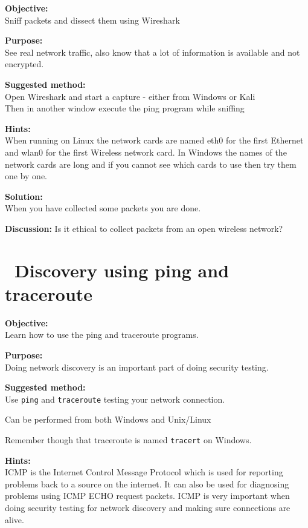 \documentclass[a4paper,11pt,notitlepage]{report}
\begin{document}
{\bf Objective:}\\
Sniff packets and dissect them using Wireshark

{\bf Purpose:}\\
See real network traffic, also know that a lot of information is available and not encrypted.

{\bf Suggested method:}\\
Open Wireshark and start a capture - either from Windows or Kali\\
Then in another window execute the ping program while sniffing

{\bf Hints:}\\
When running on Linux the network cards are named eth0 for the first Ethernet and wlan0 for the first Wireless network card. In Windows the names of the network cards are long and if you cannot see which cards to use then try them one by one.

{\bf Solution:}\\
When you have collected some packets you are done.

{\bf Discussion:}
Is it ethical to collect packets from an open wireless network?

\chapter{\faInfoCircle\ Discovery using ping and traceroute}
\label{ex:ping}

{\bf Objective:}\\
Learn how to use the ping and traceroute programs.

{\bf Purpose:}\\
Doing network discovery is an important part of doing security testing.

{\bf Suggested method:} \\
Use \verb+ping+ and \verb+traceroute+ testing your network connection.

Can be performed from both Windows and Unix/Linux

Remember though that traceroute is named \verb+tracert+ on Windows.

{\bf Hints:} \\
ICMP is the Internet Control Message Protocol which is used for reporting problems back to a source on the internet. It can also be used for diagnosing problems using ICMP ECHO request packets. ICMP is very important when doing security testing for network discovery and making sure connections are alive.
\end{document}
